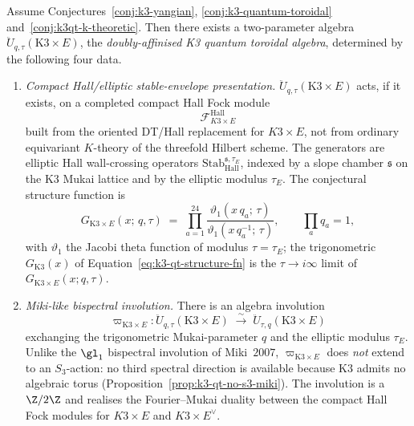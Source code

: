 \begin{conjecture}
\label{conj:k3qt-doubly-affine-uuy-mo-bispectral}
\ClaimStatusConjectured
Assume Conjectures~\ref{conj:k3-yangian},
\ref{conj:k3-quantum-toroidal} and~\ref{conj:k3qt-k-theoretic}. Then
there exists a two-parameter algebra
$\ddot U_{q, \tau}(\mathrm K3 \times E)$, the \emph{doubly-affinised K3
quantum toroidal algebra}, determined by the following four data.
\begin{enumerate}[label=\textup{(\roman*)}]
\item \emph{Compact Hall/elliptic stable-envelope presentation.}
$\ddot U_{q, \tau}(\mathrm K3 \times E)$ acts, if it exists, on a
completed compact Hall Fock module
\[
 \mathcal F^{\mathrm{Hall}}_{K3\times E}
\]
built from the oriented DT/Hall replacement for \(K3\times E\), not from
ordinary equivariant \(K\)-theory of the threefold Hilbert scheme. The
generators are elliptic Hall wall-crossing operators
\(\mathrm{Stab}_{\mathrm{Hall}}^{\mathfrak s,\tau_E}\), indexed by a
slope chamber \(\mathfrak s\) on the K3 Mukai lattice and by the
elliptic modulus \(\tau_E\). The conjectural structure function is
\[
 G_{\mathrm K3 \times E}(x;\, q, \tau)
 \;=\;
 \prod_{a = 1}^{24}
 \frac{\vartheta_1(x\, q_a;\, \tau)}{\vartheta_1(x\, q_a^{-1};\, \tau)},
 \qquad
 \prod_a q_a = 1,
\]
with $\vartheta_1$ the Jacobi theta function of modulus
$\tau = \tau_E$; the trigonometric $G_{\mathrm K3}(x)$ of
Equation~\eqref{eq:k3-qt-structure-fn} is the $\tau \to i\infty$ limit
of $G_{\mathrm K3 \times E}(x; q, \tau)$.

\item \emph{Miki-like bispectral involution.}
There is an algebra involution
\[
 \varpi_{\mathrm K3 \times E}
 \colon
 \ddot U_{q, \tau}(\mathrm K3 \times E)
 \;\xrightarrow{\sim}\;
 \ddot U_{\tau, q}(\mathrm K3 \times E)
\]
exchanging the trigonometric Mukai-parameter $q$ and the elliptic
modulus $\tau_E$. Unlike the $\gl_1$ bispectral involution of
Miki~$2007$, $\varpi_{\mathrm K3 \times E}$ does \emph{not} extend to
an $S_3$-action: no third spectral direction is available because
$\mathrm K3$ admits no algebraic torus
(Proposition~\ref{prop:k3-qt-no-s3-miki}). The involution is a
$\Z/2\Z$ and realises the Fourier--Mukai duality between the compact
Hall Fock modules for \(K3\times E\) and \(K3\times E^\vee\).


\end{enumerate}
\end{conjecture}
